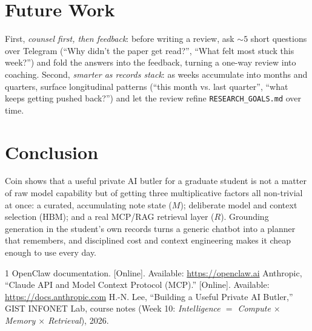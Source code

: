 \documentclass[conference]{IEEEtran}
\begin{document}
\section{Future Work}
First, \emph{counsel first, then feedback}: before writing a review, ask
${\sim}5$ short questions over Telegram (``Why didn't the paper get read?'', ``What
felt most stuck this week?'') and fold the answers into the feedback, turning a
one-way review into coaching. Second, \emph{smarter as records stack}: as weeks
accumulate into months and quarters, surface longitudinal patterns (``this month
vs. last quarter'', ``what keeps getting pushed back?'') and let the review refine
\texttt{RESEARCH\_GOALS.md} over time.

\section{Conclusion}
Coin shows that a useful private AI butler for a graduate student is not a matter
of raw model capability but of getting three multiplicative factors all
non-trivial at once: a curated, accumulating note state ($M$); deliberate model and
context selection ($\mathrm{HBM}$); and a real MCP/RAG retrieval layer ($R$).
Grounding generation in the student's own records turns a generic chatbot into a
planner that remembers, and disciplined cost and context engineering makes it cheap
enough to use every day.

\begin{thebibliography}{1}
 OpenClaw documentation. [Online]. Available: \url{https://openclaw.ai}
 Anthropic, ``Claude API and Model Context Protocol (MCP).'' [Online]. Available: \url{https://docs.anthropic.com}
 H.-N. Lee, ``Building a Useful Private AI Butler,'' GIST INFONET Lab, course notes (Week 10: \emph{Intelligence $=$ Compute $\times$ Memory $\times$ Retrieval}), 2026.
\end{thebibliography}
\end{document}
